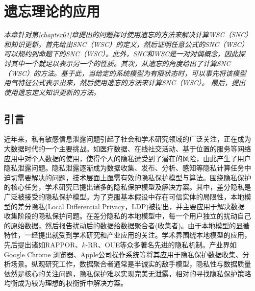 \chapter{遗忘理论的应用}
\label{chapter07}
{\em 本章针对第\ref{chapter01}章提出的问题探讨使用遗忘的方法来解决计算WSC（SNC）和知识更新。首先给出SNC（WSC）的定义，然后证明任意公式的SNC（WSC）可以规约到命题下的SNC（WSC）。此外，SNC和WSC是一对对偶概念，因此探讨其中一个就足以表示另一个的性质。其次，从遗忘的角度给出了计算SNC（WSC）的方法。基于此，当给定的系统模型为有限状态时，可以事先将该模型用气特征公式表示出来，然后使用遗忘的方法来计算SNC（WSC）。
最后，提出使用遗忘定义知识更新的方法。
	}
\section{引言}
近年来，私有敏感信息泄露问题引起了社会和学术研究领域的广泛关注，正在成为大数据时代的一个主要挑战。如医疗数据、在线社交活动、基于位置的服务等网络应用中对个人数据的使用，使得个人的隐私遭受到了潜在的风险，由此产生了用户隐私泄露问题。隐私泄露逐渐成为数据收集、发布、分析、感知等隐私计算\cite{Lifenghua16}任务中迫切需要解决的问题，技术层面上亟需有效的隐私保护模型与算法。围绕隐私保护的核心任务，学术研究已提出诸多的隐私保护模型及解决方案。其中，差分隐私\cite{dwork2006differential,dwork2006calibrating,dwork2014algorithmic}是广泛被接受的隐私保护模型。为了克服基本假设中存在可信实体的局限性，本地模型的差分隐私\cite{duchi2013local,duchi2013Minimax}(Local Differential Privacy，LDP)被提出，并主要应用于解决数据收集阶段的隐私保护问题。在差分隐私的本地模型中，每一个用户独立的扰动自己的原始数据，然后报告扰动后的数据给数据聚合者(收集者)。由于本地模型的显著特性，一经提出就受到学术研究和产业应用的关注。学术界围绕本地模型的应用，先后提出诸如RAPPOR\cite{fanti2016building,erlingsson2014rappor}、$k$-RR\cite{kairouz2016extremal}、OUE\cite{wang2017locally}等众多著名先进的隐私机制。产业界如Google Chrome 浏览器\cite{erlingsson2014rappor}、Apple公司操作系统\cite{tang2017privacy}等将其应用于隐私保护数据收集、分析场景。纵观研究工作，数据聚合者通常是半诚实的敌手模型，隐私性与数据质量依然是核心的关注问题，隐私保护难以实现完美无泄露，相对的寻找隐私保护策略均衡成为较为理想的权衡折中解决方案。

